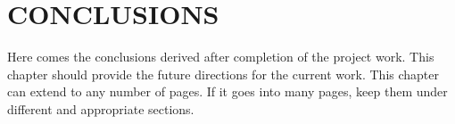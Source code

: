 \chapter{CONCLUSIONS}\label{conc}
\thispagestyle{empty}

Here comes the conclusions derived after completion of the project work. This chapter should provide the future directions for the current work. This chapter can extend to any number of pages. If it goes into many pages, keep them under different and appropriate sections. 